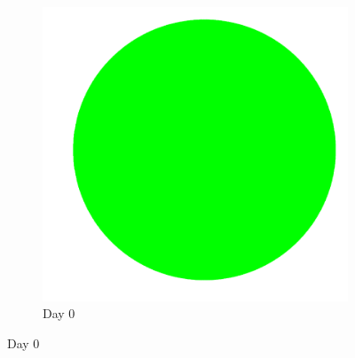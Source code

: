 \documentclass[a4paper]{article}
\begin{document}
\begin{center}
\begin{minipage}{0.65\linewidth}
\begin{figure}[H]
\begin{subfigure}[b]{0.4\linewidth}
        \includegraphics[width=\linewidth]{cell_free_photos/cellfree0.png}
        \caption{Day 0}
    \end{subfigure}


\end{figure}
\end{minipage}
\end{center}
\end{document}
